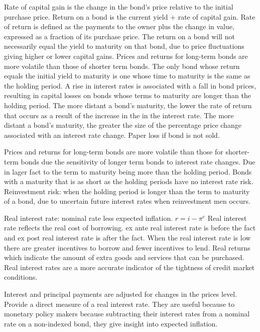 \documentclass[12pt]{examnotes}
\begin{document}
\ra Rate of capital gain is the change in the bond's price relative to the initial purchase price.
\ra Return on a bond is the current yield + rate of capital gain.
\ra Rate of return is defined as the payments to the owner plus the change in value, expressed as a fraction of its purchase price.
\ra The return on a bond will not necessarily equal the yield to maturity on that bond, due to price fluctuations giving higher or lower capital gains. 
\ra Prices and returns for long-term bonds are more volatile than those of shorter term bonds. 
\ra The only bond whose return equals the initial yield to maturity is one whose time to maturity is the same as the holding period.
\ra A rise in interest rates is associated with a fall in bond prices, resulting in capital losses on bonds whose terms to maturity are longer than the holding period.
\ra The more distant a bond's maturity, the lower the rate of return that occurs as a result of the increase in the in the interest rate. 
\ra The more distant a bond's maturity, the greater the size of the percentage price change associated with an interest rate change.
\ra Paper loss if bond is not sold.

\ra Prices and returns for long-term bonds are more volatile than those for shorter-term bonds due the sensitivity of longer term bonds to interest rate changes. 
\ra Due in lager fact to the term to maturity being more than the holding period.
\ra Bonds with a maturity that is as short as the holding periods have no interest rate risk.
\ra Reinvestment risk: when the holding period is longer than the term  to maturity of a bond, due to uncertain future interest rates when reinvestment men occurs.

\ra Real interest rate: nominal rate less expected inflation. $r=i-\pi^e$ 
\ra Real interest rate reflects the real cost of borrowing.
\ra ex ante real interest rate is before the fact and ex post real interest rate is after the fact.
\ra When the real interest rate is low there are greater incentives to borrow and fewer incentives to lend. 
\ra Real returns which indicate the amount of extra goods and services that can be purchased.
\ra Real interest rates are a more accurate indicator of the tightness of credit market conditions. 

\ra Interest and principal payments are adjusted for changes in the prices level. 
\ra Provide a direct measure of a real interest rate.
\ra They are useful because to monetary policy makers because subtracting their interest rates from a nominal rate on a non-indexed bond, they give insight into expected inflation.
\end{document}

